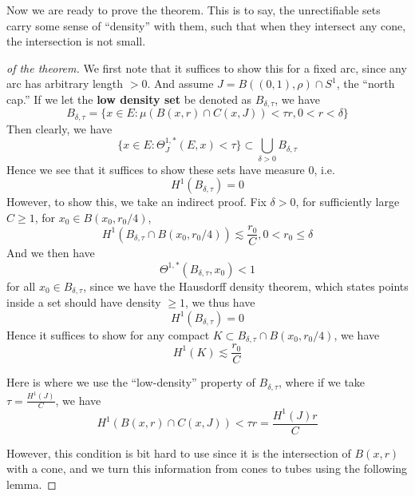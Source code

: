 Now we are ready to prove the theorem. This is to say, the unrectifiable sets carry some sense of ``density'' with them, such that when they intersect any cone, the intersection is not small.
\begin{proof}[of the theorem]
    We first note that it suffices to show this for a fixed arc, since any arc has arbitrary length $>0$. And assume $J=B((0,1), \rho)\cap S^1$, the ``north cap.'' If we let the \textbf{low density set} be denoted as $B_{\delta, \tau}$, we have
    \begin{equation*}
        B_{\delta, \tau}=\{x\in E: \mu(B(x,r)\cap C(x,J))<\tau r, 0<r<\delta\}
    \end{equation*}
    Then clearly, we have
    \begin{equation*}
        \{x\in E: \Theta_{J}^{1,*}(E,x)<\tau\}\subset\bigcup_{\delta>0}B_{\delta, \tau}
    \end{equation*}
    Hence we see that it suffices to show these sets have measure 0, i.e.
    \begin{equation*}
        H^1(B_{\delta, \tau})=0
    \end{equation*}
    However, to show this, we take an indirect proof. Fix $\delta>0$, for sufficiently large $C\geq 1$, for $x_0\in B(x_0, r_0/4)$, 
    \begin{equation*}
        H^1(B_{\delta,\tau}\cap B(x_0, r_0/4))\lesssim\frac{r_0}{C}, 0<r_0\leq\delta
    \end{equation*}
    And we then have 
    \begin{equation*}
        \Theta^{1,*}(B_{\delta,\tau}, x_0)<1
    \end{equation*}
    for all $x_0\in B_{\delta, \tau}$, since we have the Hausdorff density theorem, which states points inside a set should have density $\geq 1$, we thus have
    \begin{equation*}
        H^1(B_{\delta,\tau})=0
    \end{equation*}
    Hence it suffices to show for any compact $K\subset B_{\delta,\tau}\cap B(x_0, r_0/4)$, we have
    \begin{equation*}
        H^1(K)\lesssim \frac{r_0}{C}
    \end{equation*}
    \begin{note}
        Here is where we use the ``low-density'' property of $B_{\delta, \tau}$, where if we take $\tau=\frac{H^1(J)}{C}$, we have
        \begin{equation*}
            H^1(B(x,r)\cap C(x,J))<\tau r=\frac{H^1(J)r}{C}
        \end{equation*} 
    \end{note}
    However, this condition is bit hard to use since it is the intersection of $B(x,r)$ with a cone, and we turn this information from cones to tubes using the following lemma.
    

\end{proof}
